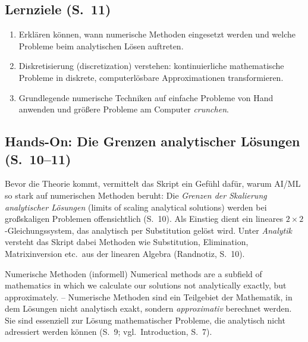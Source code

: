 \subsection{Lernziele (S.~11)}

\begin{enumerate}[itemsep=1pt]
  \item Erklären können, wann numerische Methoden eingesetzt werden und welche Probleme beim analytischen Lösen auftreten.
  \item Diskretisierung (discretization) verstehen: kontinuierliche mathematische Probleme in diskrete, computerlösbare Approximationen transformieren.
  \item Grundlegende numerische Techniken auf einfache Probleme von Hand anwenden und größere Probleme am Computer \emph{crunchen}.
\end{enumerate}

\subsection{Hands-On: Die Grenzen analytischer Lösungen (S.~10--11)}

Bevor die Theorie kommt, vermittelt das Skript ein Gefühl dafür, warum AI/ML so stark auf numerischen Methoden beruht: Die \emph{Grenzen der Skalierung analytischer Lösungen} (limits of scaling analytical solutions) werden bei großskaligen Problemen offensichtlich (S.~10). Als Einstieg dient ein lineares $2\times 2$-Gleichungssystem, das analytisch per Substitution gelöst wird. Unter \emph{Analytik} versteht das Skript dabei Methoden wie Substitution, Elimination, Matrixinversion etc.\ aus der linearen Algebra (Randnotiz, S.~10).

\begin{defbox}{Numerische Methoden (informell)}
\glqq Numerical methods are a subfield of mathematics in which we calculate our solutions not analytically exactly, but approximately.\grqq{} -- Numerische Methoden sind ein Teilgebiet der Mathematik, in dem Lösungen nicht analytisch exakt, sondern \emph{approximativ} berechnet werden. Sie sind essenziell zur Lösung mathematischer Probleme, die analytisch nicht adressiert werden können (S.~9; vgl.\ Introduction, S.~7).
\end{defbox}

